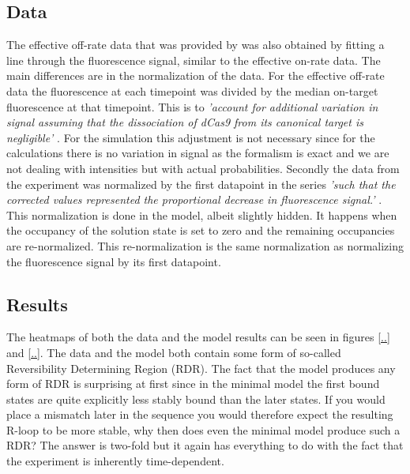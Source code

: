 \subsection{Data}
The effective off-rate data that was provided by \cite{PNAS} was also obtained by fitting a line through the fluorescence signal, similar to the effective on-rate data. The main differences are in the normalization of the data. For the effective off-rate data the fluorescence at each timepoint was divided by the median on-target fluorescence at that timepoint. This is to \textit{'account for additional variation in signal assuming that the dissociation of dCas9 from its canonical target is negligible'} \citep{PNAS}. For the simulation this adjustment is not necessary since for the calculations there is no variation in signal as the formalism is exact and we are not dealing with intensities but with actual probabilities. Secondly the data from the experiment was normalized by the first datapoint in the series \textit{'such that the corrected values represented the proportional decrease in fluorescence signal.'} \citep{PNAS}. This normalization is done in the model, albeit slightly hidden. It happens when the occupancy of the solution state is set to zero and the remaining occupancies are re-normalized. This re-normalization is the same normalization as normalizing the fluorescence signal by its first datapoint.


\subsection{Results}

The heatmaps of both the data and the model results can be seen in figures \ref{..} and \ref{..}. The data and the model both contain some form of so-called Reversibility Determining Region (RDR). The fact that the model produces any form of RDR is surprising at first since in the minimal model the first bound states are quite explicitly less stably bound than the later states. If you would place a mismatch later in the sequence you would therefore expect the resulting R-loop to be more stable, why then does even the minimal model produce such a RDR? The answer is two-fold but it again has everything to do with the fact that the experiment is inherently time-dependent.


